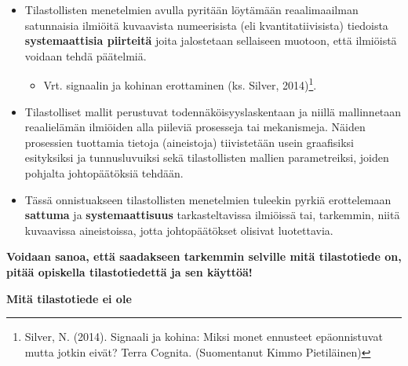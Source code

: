 \documentclass[
]{book}
\providecommand{\tightlist}{%
  \setlength{\itemsep}{0pt}\setlength{\parskip}{0pt}}
\begin{document}
\begin{itemize}
  \begin{itemize}
  \tightlist
  \item
    Tilastollisten menetelmien avulla pyritään löytämään reaalimaailman satunnaisia ilmiöitä kuvaavista numeerisista (eli kvantitatiivisista) tiedoista \textbf{systemaattisia piirteitä} joita jalostetaan sellaiseen muotoon, että ilmiöistä voidaan tehdä päätelmiä.

    \begin{itemize}
    \tightlist
    \item
      Vrt. signaalin ja kohinan erottaminen (ks. Silver, 2014)\footnote{Silver, N. (2014). Signaali ja kohina: Miksi monet ennusteet epäonnistuvat mutta jotkin eivät? Terra Cognita. (Suomentanut Kimmo Pietiläinen)}.
    \end{itemize}
  \item
    Tilastolliset mallit perustuvat todennäköisyyslaskentaan ja niillä mallinnetaan reaalielämän ilmiöiden alla piileviä prosesseja tai mekanismeja. Näiden prosessien tuottamia tietoja (aineistoja) tiivistetään usein graafisiksi esityksiksi ja tunnusluvuiksi sekä tilastollisten mallien parametreiksi, joiden pohjalta johtopäätöksiä tehdään.
  \item
    Tässä onnistuakseen tilastollisten menetelmien tuleekin pyrkiä erottelemaan \textbf{sattuma} ja \textbf{systemaattisuus} tarkasteltavissa ilmiöissä tai, tarkemmin, niitä kuvaavissa aineistoissa, jotta johtopäätökset olisivat luotettavia.
  \end{itemize}
\end{itemize}

\hfill\break

\textbf{Voidaan sanoa, että saadakseen tarkemmin selville mitä tilastotiede on, pitää opiskella tilastotiedettä ja sen käyttöä!}

\hfill\break

\textbf{Mitä tilastotiede ei ole}
\end{document}

